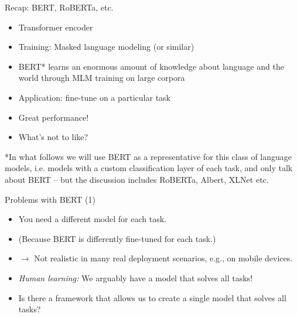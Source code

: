 \documentclass[11pt,compress,t,notes=noshow, xcolor=table]{beamer}
\begin{document}


\begin{frame}{Recap: BERT, RoBERTa, etc.}

\vfill

  \begin{itemize}
\item Transformer encoder
\item Training: Masked language modeling (or similar)
\item BERT* learns an enormous amount of knowledge
about language and the world through MLM training on large corpora
\item Application: fine-tune on a particular task
\item Great performance!
\item \ques What's not to like?
    \end{itemize}

\vfill

*\scriptsize{In what follows we will use BERT as a representative for this class of language models, i.e. models with a custom classification layer of each task, and only talk about BERT -- but the discussion includes RoBERTa, Albert, XLNet etc.}

\end{frame}


\begin{frame}{Problems with BERT (1)}

\vfill

  \begin{itemize}
\item You need a different model for each task.
\item[] (Because BERT is differently fine-tuned for each task.)
\item[] $\to$ Not realistic in many real deployment scenarios, e.g., on mobile devices.
\item \textit{Human learning:} We arguably have a  model that solves all tasks!
\item \ques Is there a framework that allows us to create a single model that solves all tasks?
    \end{itemize}

\vfill

\end{frame}
\end{document}
